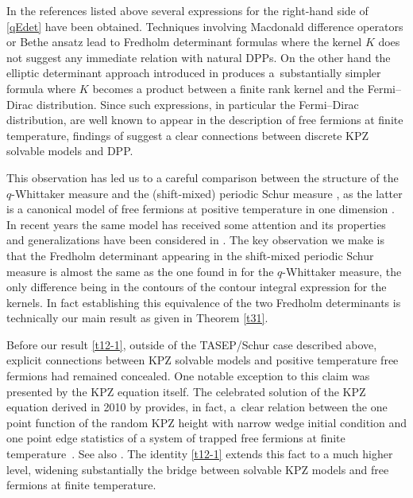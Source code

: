 \documentclass[pdftex]{sigma}
\numberwithin{equation}{section}
\begin{document}
 In the references listed above several expressions for the right-hand side of \eqref{qEdet} have been obtained. Techniques involving Macdonald difference operators or Bethe ansatz lead to Fredholm determinant formulas where the kernel $K$ does not suggest any immediate relation with natural DPPs.
 On the other hand the elliptic determinant approach introduced in \cite{ImamuraSasamoto2019qTASEPtheta} produces a~substantially simpler formula where $K$ becomes a product between a finite rank kernel and the Fermi--Dirac distribution. Since such expressions, in particular the Fermi--Dirac distribution, are well known to appear in the description of free fermions at finite temperature, findings of \cite{ImamuraSasamoto2019qTASEPtheta} suggest a clear connections between discrete KPZ solvable models and DPP.

 This observation has led us to a careful comparison between the structure of the $q$-Whittaker measure and the (shift-mixed) periodic Schur measure \cite{Borodin2007PeriodicSchur}, as the latter is a canonical model of free fermions at positive temperature in one dimension \cite{BeteaBouttier2019PeriodicSchur}.
 In recent years the same model has received some attention and its properties and generalizations have been considered in \cite{Ahn-Russkikh-VanPeski2021GFFcylinder,BeteaBouttNejVul2018freeBoundarySchur,Koshida2021periodicmac}.
 The key observation we make is that the Fredholm determinant appearing in the shift-mixed periodic Schur measure is almost the same as the one found in \cite{ImamuraSasamoto2019qTASEPtheta} for the $q$-Whittaker measure, the only difference being in the contours of the contour integral expression for the kernels. In fact establishing this equivalence of the two Fredholm determinants is technically our main result as given in Theorem \ref{t31}.


 Before our result \eqref{t12-1}, outside of the TASEP/Schur case described above, explicit connections between KPZ solvable models and positive temperature free fermions
 had remained concealed. One notable exception to this claim was presented by the KPZ equation itself. The celebrated solution of the KPZ equation derived in 2010 by \cite{Amir-Corwin-Quastel2011KPZ,Calabrese-leDoussal-Rosso2010KPZ,Dotsenko2010KPZ,Sasamoto-Spohn2010KPZ-NPB,Sasamoto-Spohn2010KPZ-PRL} provides, in fact, a~clear relation between the one point function of the random KPZ height with narrow wedge initial condition and one point edge statistics of a system of trapped free fermions at finite temperature~\cite{Dean-LeDoussal-Majumdar-Schehr2015KPZfermion}. See also \cite{Johansson2007AiryFermi, Liechty-Wang2020fermion}.
 The identity \eqref{t12-1} extends this fact to a much higher level, widening substantially the bridge between solvable KPZ models and free fermions at finite temperature.
\end{document}
